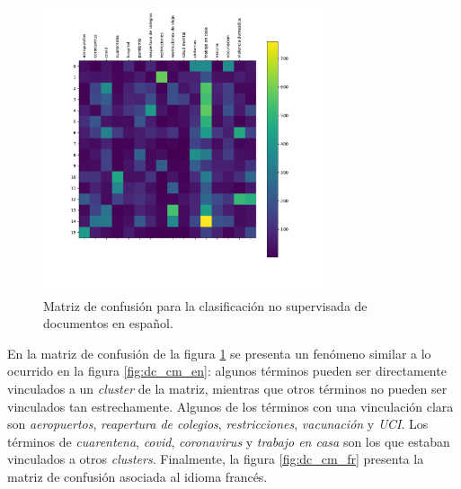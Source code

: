 \begin{figure}[H]
    \centering
    \includegraphics[width=0.75\textwidth]{results/AutomaticIdentification/cf_es.pdf}
    \caption{Matriz de confusión para la clasificación no supervisada de documentos en español.}
    \label{fig:dc_cm_es}
\end{figure}

En la matriz de confusión de la figura \ref{fig:dc_cm_es} se presenta un fenómeno similar a lo ocurrido en la figura \ref{fig:dc_cm_en}: algunos términos pueden ser directamente vinculados a un \textit{cluster} de la matriz, mientras que otros términos no pueden ser vinculados tan estrechamente. Algunos de los términos con una vinculación clara son \textit{aeropuertos}, \textit{reapertura de colegios}, \textit{restricciones}, \textit{vacunación} y \textit{UCI}. Los términos de \textit{cuarentena}, \textit{covid}, \textit{coronavirus} y \textit{trabajo en casa} son los que estaban vinculados a otros \textit{clusters}. Finalmente, la figura \ref{fig:dc_cm_fr} presenta la matriz de confusión asociada al idioma francés. \\

